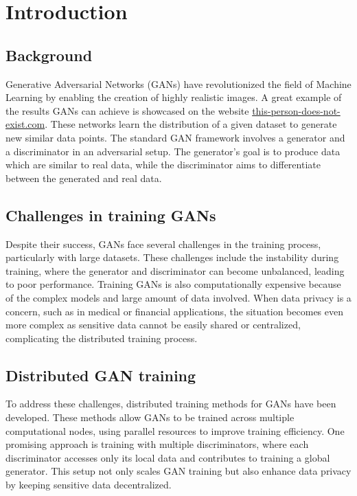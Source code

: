 \chapter{Introduction}

\section{Background}
Generative Adversarial Networks (GANs) have revolutionized the field of Machine Learning by enabling the creation of highly realistic images. A great example of the results GANs can achieve is showcased on the website \href{https://this-person-does-not-exist.com/en}{this-person-does-not-exist.com}. These networks learn the distribution of a given dataset to generate new similar data points. The standard GAN framework involves a generator and a discriminator in an adversarial setup. The generator's goal is to produce data which are similar to real data, while the discriminator aims to differentiate between the generated and real data.

\section{Challenges in training GANs}
Despite their success, GANs face several challenges in the training process, particularly with large datasets. These challenges include the instability during training, where the generator and discriminator can become unbalanced, leading to poor performance. Training GANs is also computationally expensive because of the complex models and large amount of data involved. When data privacy is a concern, such as in medical or financial applications, the situation becomes even more complex as sensitive data cannot be easily shared or centralized, complicating the distributed training process.

\section{Distributed GAN training}
To address these challenges, distributed training methods for GANs have been developed. These methods allow GANs to be trained across multiple computational nodes, using parallel resources to improve training efficiency. One promising approach is training with multiple discriminators, where each discriminator accesses only its local data and contributes to training a global generator. This setup not only scales GAN training but also enhance data privacy by keeping sensitive data decentralized.

